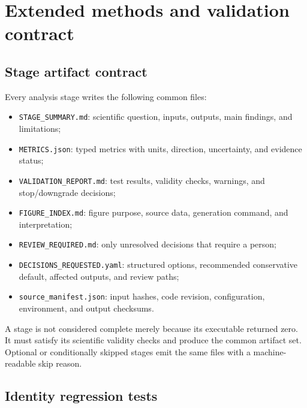 \section{Extended methods and validation contract}
\label{sec:supp-extended-methods}

\subsection{Stage artifact contract}

Every analysis stage writes the following common files:
\begin{itemize}
  \item \texttt{STAGE\_SUMMARY.md}: scientific question, inputs, outputs, main findings, and limitations;
  \item \texttt{METRICS.json}: typed metrics with units, direction, uncertainty, and evidence status;
  \item \texttt{VALIDATION\_REPORT.md}: test results, validity checks, warnings, and stop/downgrade decisions;
  \item \texttt{FIGURE\_INDEX.md}: figure purpose, source data, generation command, and interpretation;
  \item \texttt{REVIEW\_REQUIRED.md}: only unresolved decisions that require a person;
  \item \texttt{DECISIONS\_REQUESTED.yaml}: structured options, recommended conservative default, affected outputs, and review paths;
  \item \texttt{source\_manifest.json}: input hashes, code revision, configuration, environment, and output checksums.
\end{itemize}

A stage is not considered complete merely because its executable returned zero. It must satisfy its scientific validity checks and produce the common artifact set. Optional or conditionally skipped stages emit the same files with a machine-readable skip reason.

\subsection{Identity regression tests}

